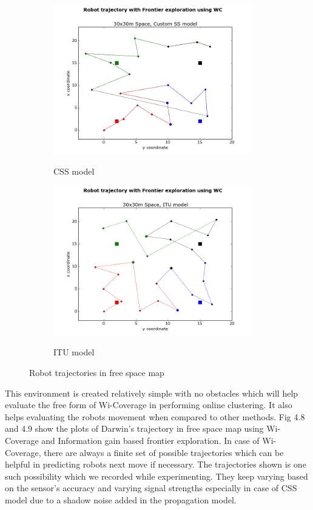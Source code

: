 \begin{figure}[!h]
\centering
	\begin{subfigure}[b]{\textwidth}
	    \centering
		\includegraphics[width=0.95\textwidth]{images/traj_cm_30x30.png}
		\label{subfig:a}
		\caption{CSS model}
	\end{subfigure}
	\begin{subfigure}[b]{\textwidth}
	    \centering
		\includegraphics[width=0.95\textwidth]{images/30x30_itu_traj_final.png}
		\label{subfig:b}
		\caption{ITU model}
	\end{subfigure}
\caption{Robot trajectories in free space map}
\end{figure}

This environment is created relatively simple with no obstacles which will help evaluate the free form of Wi-Coverage in performing online clustering. It also helps evaluating the robots movement when compared to other methods. Fig 4.8 and 4.9 show the plots of Darwin's trajectory in free space map using Wi-Coverage and Information gain based frontier exploration. In case of Wi-Coverage, there are always a finite set of possible trajectories which can be helpful in predicting robots next move if necessary. The trajectories shown is one such possibility which we recorded while experimenting. They keep varying based on the sensor's accuracy and varying signal strengths especially in case of CSS model due to a shadow noise added in the propagation model. 

